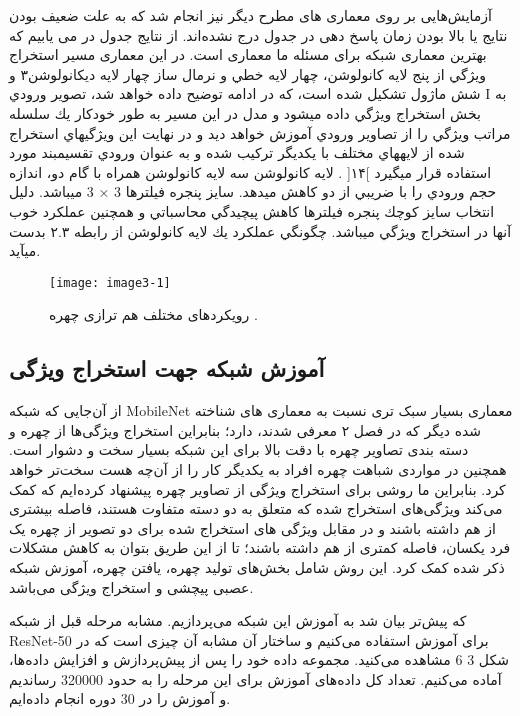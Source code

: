 آزمایش‌هایی بر روی معماری های مطرح دیگر نیز انجام شد که به علت ضعیف بودن نتایج یا بالا بودن زمان پاسخ دهی در جدول‌ درج نشده‌اند. از نتایج جدول‌ در می یابیم که بهترین معماری شبکه برای مسئله ما معماری  است.
\noindent
در این معماری مسير استخراج ويژگي از پنج لايه كانولوشن، چهار لايه خطي و نرمال ساز چهار لايه ديكانولوشن۳ و شش ماژول  تشکیل شده است، كه در ادامه توضيح داده خواهد شد، تصوير ورودي I به بخش استخراج ويژگي داده ميشود و مدل در اين مسير به طور خودكار يك سلسله مراتب ويژگي را از تصاوير ورودي آموزش خواهد ديد و در نهايت اين ويژگيهاي استخراج شده از لايههاي مختلف با يكديگر تركيب شده و به عنوان ورودي تقسيمبند مورد استفاده قرار ميگيرد ]۱۴[ .
\noindent
لايه كانولوشن
سه لايه كانولوشن همراه با گام دو، اندازه حجم ورودي را با ضريبي از دو كاهش ميدهد. سايز پنجره فيلترها 3 × 3 ميباشد. دليل انتخاب سايز كوچك پنجره فيلترها كاهش پيچيدگي محاسباتي و همچنين عملكرد خوب آنها در استخراج ويژگي ميباشد. چگونگي عملكرد يك لايه كانولوشن از رابطه ۲.۳ بدست
ميآيد.
 \begin{figure}[h]
\centering
  \texttt{[image: image3-1]}
  \caption{رویکردهای مختلف هم ترازی چهره \cite{ref1}.}
  \label{image2-1}
\end{figure}


\subsection{آموزش شبکه جهت استخراج ویژگی}
از آن‌جایی که ‌شبکه MobileNet معماری بسیار سبک تری نسبت به معماری های شناخته شده دیگر که در فصل ۲ معرفی شدند، دارد؛ بنابراین استخراج ویژگی‌ها از چهره و دسته بندی تصاویر چهره با دقت بالا برای این شبکه بسیار سخت و دشوار است. همچنین در مواردی شباهت چهره افراد به یکدیگر ‌کار را از آن‌چه هست سخت‌تر خواهد کرد. بنابراین ما روشی برای استخراج ویژگی از تصاویر چهره پیشنهاد کرده‌ایم که کمک می‌کند ویژگی‌های استخراج شده که متعلق به دو دسته متفاوت هستند، فاصله بیشتری از هم داشته باشند و در مقابل ویژگی های استخراج شده برای دو تصویر از چهره یک فرد یکسان، فاصله کمتری از هم داشته باشند؛ تا از این طریق بتوان به کاهش مشکلات ذکر شده کمک کرد. این روش شامل بخش‌های تولید چهره، یافتن چهره، آموزش شبکه عصبی پیچشی و ‌استخراج ویژگی می‌باشد.

که پیش‌تر بیان شد به آموزش این شبکه می‌پردازیم. مشابه مرحله قبل از شبکه ResNet-50 برای آموزش استفاده می‌کنیم و ساختار آن مشابه آن چیزی است که در شکل ‏3 6 مشاهده می‌کنید. مجموعه داده خود را پس از پیش‌پردازش و افزایش‌ داده‌ها، آماده می‌کنیم. تعداد کل داده‌های آموزش برای این مرحله را به حدود 320000 رساندیم و آموزش را در 30 دوره انجام داده‌ایم.
